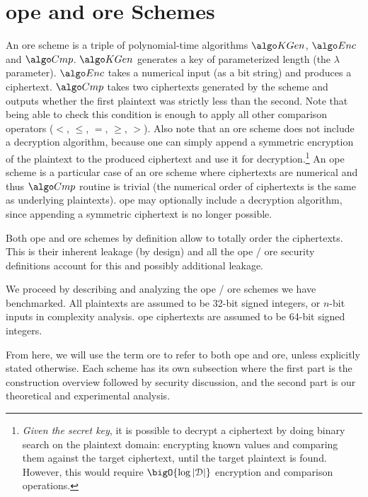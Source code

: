 \section{\texorpdfstring{\acrshort{ope}}{OPE} and \texorpdfstring{\acrshort{ore}}{ORE} Schemes}

	An \acrlong{ore} scheme is a triple of polynomial\hyp{}time algorithms $\setup$, $\encrypt$ and $\compare$.
	$\setup$ generates a key of parameterized length (the $\lambda$ parameter).
	$\encrypt$ takes a numerical input (as a bit string) and produces a ciphertext.
	$\compare$ takes two ciphertexts generated by the scheme and outputs whether the first plaintext was strictly less than the second.
	Note that being able to check this condition is enough to apply all other comparison operators ($<$, $\le$, $=$, $\ge$, $>$).
	Also note that an \acrshort{ore} scheme does not include a decryption algorithm, because one can simply append a symmetric encryption of the plaintext to the produced ciphertext and use it for decryption.\footnote{
		\emph{Given the secret key}, it is possible to decrypt a ciphertext by doing binary search on the plaintext domain: encrypting known values and comparing them against the target ciphertext, until the target plaintext is found.
		However, this would require $\bigO{\log{|\domain|}}$ encryption and comparison operations.
	}
	An \acrfull{ope} scheme is a particular case of an \acrshort{ore} scheme where ciphertexts are numerical and thus $\compare$ routine is trivial (the numerical order of ciphertexts is the same as underlying plaintexts).
	\acrshort{ope} may optionally include a decryption algorithm, since appending a symmetric ciphertext is no longer possible.

	Both \acrshort{ope} and \acrshort{ore} schemes by definition allow to totally order the ciphertexts.
	This is their inherent leakage (by design) and all the \acrshort{ope} / \acrshort{ore} security definitions account for this and possibly additional leakage.

	We proceed by describing and analyzing the \acrshort{ope} / \acrshort{ore} schemes we have benchmarked.
	All plaintexts are assumed to be 32-bit signed integers, or $n$-bit inputs in complexity analysis.
	\acrshort{ope} ciphertexts are assumed to be 64-bit signed integers.

	From here, we will use the term \acrshort{ore} to refer to both \acrshort{ope} and \acrshort{ore}, unless explicitly stated otherwise.
	Each scheme has its own subsection where the first part is the construction overview followed by security discussion, and the second part is our theoretical and experimental analysis.

